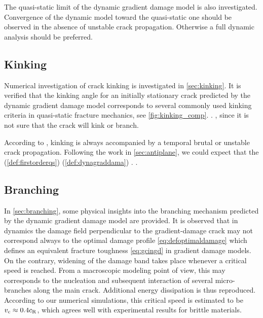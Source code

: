 The quasi-static limit of the dynamic gradient damage model is also investigated. Convergence of the dynamic model toward the quasi-static one should be observed in the absence of unstable crack propagation. Otherwise a full dynamic analysis should be preferred.

\subsection{Kinking}
Numerical investigation of crack kinking is investigated in \cref{sec:kinking}. It is verified that the kinking angle for an initially stationary crack predicted by the dynamic gradient damage model corresponds to several commonly used kinking criteria in quasi-static fracture mechanics, see \cref{fig:kinking_comp}. . , since it is not sure that the crack will kink or branch.

According to \cite{ChambolleFrancfortMarigo:2009}, kinking is always accompanied by a temporal brutal or unstable crack propagation. Following the work in \cref{sec:antiplane}, we could expect that the  (\cref{def:firstorderqs})  (\cref{def:dynagraddama}) . .

\subsection{Branching}
In \cref{sec:branching}, some physical insights into the branching mechanism predicted by the dynamic gradient damage model are provided. It is observed that in dynamics the damage field perpendicular to the gradient-damage crack may not correspond always to the optimal damage profile \eqref{eq:defoptimaldamage} which defines an equivalent fracture toughness \eqref{eq:gcingd} in gradient damage models. On the contrary, widening of the damage band takes place whenever a critical speed is reached. From a macroscopic modeling point of view, this may corresponds to the nucleation and subsequent interaction of several micro-branches along the main crack. Additional energy dissipation is thus reproduced. According to our numerical simulations, this critical speed is estimated to be $v_{\mathrm{c}}\approx0.4c_\mathrm{R}$, which agrees well with experimental results for brittle materials.

